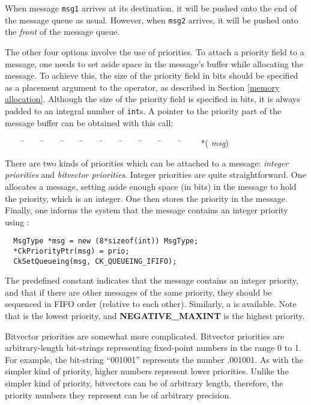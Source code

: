 When message {\tt msg1} arrives at its destination, it will be pushed
onto the end of the message queue as usual.  However, when {\tt msg2}
arrives, it will be pushed onto the {\it front} of the message queue.

The other four options involve the use of
priorities.  To attach a priority field to a
message, one needs to set aside space in the message's buffer while
allocating the message.  To achieve this, the
size of the priority field in bits should be
specified as a placement argument to the  operator, as
described in Section \ref{memory allocation}.  Although the size of
the priority field is specified in bits, it is always padded to an
integral number of {\tt int}s.  A pointer to the priority part of the
message buffer can be obtained with this call:

\begin{tabbing}
~~~~ \=~~~~ \=~~~~ \=~~~~ \=~~~~ \=~~~~ \=~~~~ \=~~~~ \=~~~~ \=~~~~ \kill
\>  *( {\it msg}) \\
\end{tabbing}

There are two kinds of priorities which can be attached to a message:
{\sl integer priorities} and {\sl bitvector
priorities}.  Integer priorities are quite
straightforward.  One allocates a message, setting aside enough space
(in bits) in the message to hold the priority, which is an integer.
One then stores the priority in the message.  Finally, one informs the
system that the message contains an integer priority using
:

\begin{verbatim}
  MsgType *msg = new (8*sizeof(int)) MsgType;
  *CkPriorityPtr(msg) = prio;
  CkSetQueueing(msg, CK_QUEUEING_IFIFO);
\end{verbatim}

The predefined constant   indicates that the
message contains an integer priority, and that if there are other
messages of the same priority, they should be sequenced in FIFO order
(relative to each other).  Similarly, a   is
available.  Note that   is the lowest priority, and {\bf
NEGATIVE\_MAXINT} is the highest priority.

Bitvector priorities are somewhat more complicated.  Bitvector
priorities are arbitrary-length bit-strings representing fixed-point
numbers in the range 0 to 1.  For example, the bit-string ``001001''
represents the number .001001\raisebox{-.5ex}{\scriptsize binary}.  As
with the simpler kind of priority, higher numbers represent lower
priorities.  Unlike the simpler kind of priority, bitvectors can be of
arbitrary length, therefore, the priority numbers they represent can
be of arbitrary precision.

